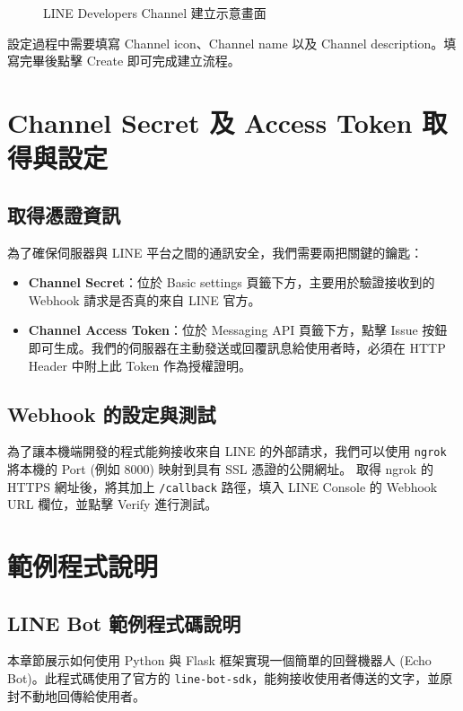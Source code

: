\documentclass[12pt, a4paper]{article} %
\begin{document}
\begin{figure}[h]
\centering
\setlength{\fboxsep}{10pt}
\caption{LINE Developers Channel 建立示意畫面}
\label{fig:line_console}
\end{figure}

設定過程中需要填寫 Channel icon、Channel name 以及 Channel description。填寫完畢後點擊 Create 即可完成建立流程。

\newpage
\section{Channel Secret 及 Access Token 取得與設定}
\subsection{取得憑證資訊}
為了確保伺服器與 LINE 平台之間的通訊安全，我們需要兩把關鍵的鑰匙：
\begin{itemize}
    \item \textbf{Channel Secret}：位於 Basic settings 頁籤下方，主要用於驗證接收到的 Webhook 請求是否真的來自 LINE 官方。
    \item \textbf{Channel Access Token}：位於 Messaging API 頁籤下方，點擊 Issue 按鈕即可生成。我們的伺服器在主動發送或回覆訊息給使用者時，必須在 HTTP Header 中附上此 Token 作為授權證明。
\end{itemize}

\subsection{Webhook 的設定與測試}
為了讓本機端開發的程式能夠接收來自 LINE 的外部請求，我們可以使用 \texttt{ngrok} 將本機的 Port (例如 8000) 映射到具有 SSL 憑證的公開網址。
取得 ngrok 的 HTTPS 網址後，將其加上 \texttt{/callback} 路徑，填入 LINE Console 的 Webhook URL 欄位，並點擊 Verify 進行測試。

\newpage
\section{範例程式說明}
\subsection{LINE Bot 範例程式碼說明}
本章節展示如何使用 Python 與 Flask 框架實現一個簡單的回聲機器人 (Echo Bot)。此程式碼使用了官方的 \texttt{line-bot-sdk}，能夠接收使用者傳送的文字，並原封不動地回傳給使用者。
\end{document}
